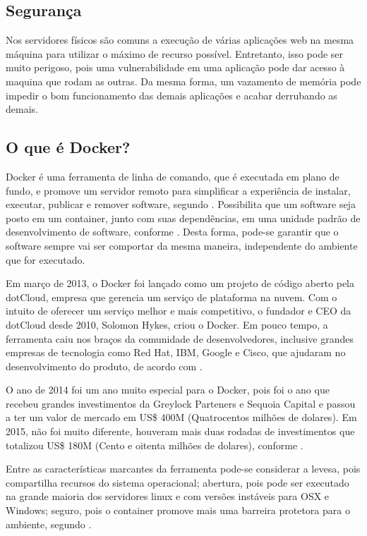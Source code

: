 \documentclass[
	12pt,				%
	openright,			%
	oneside,			%
	a4paper,			%
	chapter=TITLE,		%
	section=TITLE,		%
	english,			%
	french,				%
	spanish,			%
	brazil				%
	]{abntex2}
\begin{document}
\subsection{Segurança}

Nos servidores físicos são comuns a execução de várias aplicações web na mesma máquina para utilizar o máximo de recurso possível. Entretanto, isso pode ser muito perigoso, pois uma vulnerabilidade em uma aplicação pode dar acesso à maquina que rodam as outras. Da mesma forma, um vazamento de memória pode impedir o bom funcionamento das demais aplicações e acabar derrubando as demais.

\subsection{O que é Docker?}

Docker é uma ferramenta de linha de comando, que é executada em plano de fundo, e promove um servidor remoto para simplificar a experiência de instalar, executar, publicar e remover software, segundo . Possibilita que um software seja posto em um container, junto com suas dependências, em uma unidade padrão de desenvolvimento de software, conforme . Desta forma, pode-se garantir que o software sempre vai ser comportar da mesma maneira, independente do ambiente que for executado.

Em março de 2013, o Docker foi lançado como um projeto de código aberto pela dotCloud, empresa que gerencia um serviço de plataforma na nuvem. Com o intuito de oferecer um serviço melhor e mais competitivo, o fundador e CEO da dotCloud desde 2010, Solomon Hykes, criou o Docker. Em pouco tempo, a ferramenta caiu nos braços da comunidade de desenvolvedores, inclusive grandes empresas de tecnologia como Red Hat, IBM, Google e Cisco, que ajudaram no desenvolvimento do produto, de acordo com .

O ano de 2014 foi um ano muito especial para o Docker, pois foi o ano que recebeu grandes investimentos da Greylock Parteners e Sequoia Capital e passou a ter um valor de mercado em US\$ 400M (Quatrocentos milhões de dolares). Em 2015, não foi muito diferente, houveram mais duas rodadas de investimentos que totalizou US\$ 180M (Cento e oitenta milhões de dolares), conforme  . 

Entre as características marcantes da ferramenta pode-se considerar a levesa, pois compartilha recursos do sistema operacional; abertura, pois pode ser executado na grande maioria dos servidores linux e com versões instáveis para OSX e Windows; seguro, pois o container promove mais uma barreira protetora para o ambiente, segundo .
\end{document}
